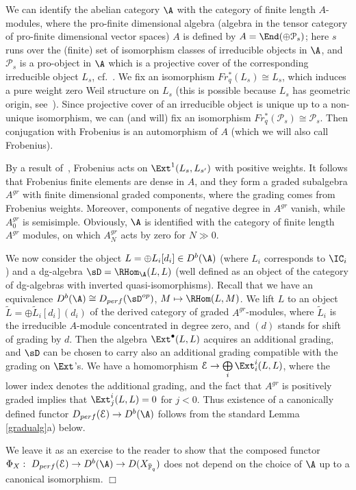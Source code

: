 \documentclass[11pt]{amsart}
\theoremstyle{definition}
\theoremstyle{remark}
\theoremstyle{remark}
\newcommand{\cal}{\mathcal}
\newcommand{\bu}{\bullet}
\newcommand{\<}{\langle}
\renewcommand{\>}{\rangle}
\renewcommand{\P}{{\cal P}}
\newcommand{\oplusl}{\bigoplus\limits}
\newcommand{\Fqbar}{{\bar{\mathbb F}_q}}
\newcommand{\Epur}{{\mathcal E}}
\begin{document}
We can identify the abelian category $\A$ with the category of finite length $A$-modules,
where the pro-finite dimensional algebra (algebra in the 
tensor category of pro-finite
dimensional vector spaces) $A$ is defined by
$A=\End(\oplus \P_s)$; here $s$ runs over the (finite) set of isomorphism
classes of irreducible objects in $\A$, and  $\P_s$ is a pro-object in 
$\A$ which is a projective
cover of the corresponding irreducible object $L_s$, cf.~\cite{B}.
We fix an isomorphism $Fr_q^*(L_s)\cong L_s$, which induces a pure weight 
zero Weil structure
on $L_s$ (this is possible because $L_s$ 
has geometric origin, see~\cite{BBD}).
Since projective cover of an irreducible object is unique 
up to a non-unique isomorphism,
we can (and will) fix an isomorphism $Fr_q^*(\P_s)\cong \P_s$. 
Then conjugation with Frobenius
is an automorphism of $A$ (which we will also call Frobenius).

By a result of~\cite{BBD}, Frobenius acts on $\Ext^1(L_s,L_{s'})$ 
with positive weights. It follows
that Frobenius finite elements are dense in $A$, and they form a graded subalgebra $A^{gr}$ with
finite dimensional graded components, where
the grading comes from Frobenius weights. Moreover, components of negative degree in $A^{gr}$ vanish,
while $A^{gr}_0$ is semisimple.
Obviously, $\A$ is identified with the category of finite length $A^{gr}$ modules, on which $A^{gr}_N$
acts by zero for $N\gg 0$. 


We now consider the object 
 $L=\oplus L_i[d_i]\in D^b(\A)$ (where $L_i$ corresponds to $\IC_i$) and a dg-algebra $\sD=\RHom_\A(L,L)$
(well defined as an object of the category of dg-algebras with inverted quasi-isomorphisms).
Recall that we have an equivalence $D^b(\A)\cong D_{perf}(\sD^{op})$, $M\mapsto \RHom(L,M)$.
We lift $L$ to an object $\tilde L=\oplus \tilde L_i[d_i](d_i)$ of the derived category of graded 
$A^{gr}$-modules, where $\tilde L_i$ is the irreducible $A$-module concentrated in degree zero,
and $(d)$ stands for shift of grading by $d$. Then the algebra $\Ext^\bu(L,L)$ acquires
an additional grading, and $\sD$ can be chosen to carry also an additional grading compatible
with the grading on $\Ext$'s. 
We have a homomorphism $\Epur\to\oplusl_i\Ext^i_i(L,L)$, where
the lower index denotes the additional grading, 
and the fact that $A^{gr}$ is positively graded
implies that $\Ext^i_j(L,L)=0$ for $j<0$. 
Thus existence of a canonically defined functor $D_{perf}(\Epur)\to D^b(\A)$ follows from the 
standard Lemma \ref{gradualg}a) below. 

We leave it as an exercise to the reader to show that the composed
functor $\Phi_X:\ D_{perf}(\Epur)
\to D^b(\A)\to D(X_{\Fqbar})$ does not depend on the choice of $\A$ 
up to a canonical isomorphism. \hfill $\Box$
\end{document}
